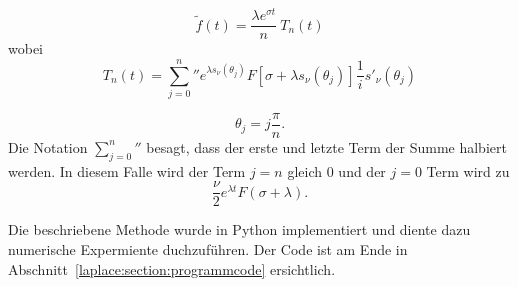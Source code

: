 \begin{equation}
\tilde{f}(t) = \frac{\lambda e^{\sigma t}}{n}~T_{n}(t)
\end{equation}
wobei 
\begin{equation}
T_{n}(t)
=
{\sum_{j=0}^n}'' e^{\lambda s_{\nu}(\theta_{j})}
F[\sigma + \lambda s_{\nu}(\theta_{j})]
\frac{1}{i} s'_{\nu}(\theta_{j})
\end{equation}

\begin{equation}
\theta_{j} = j \frac{\pi}{n}.
\end{equation}
Die Notation ${\sum_{j=0}^n}''$ besagt, dass der erste und letzte
Term der Summe halbiert werden.
In diesem Falle wird der Term $j=n$ gleich 0 und der $j=0$ Term wird zu
\begin{equation}
\frac{\nu}{2}e^{\lambda t}F(\sigma + \lambda).
\end{equation}


Die beschriebene Methode wurde in Python implementiert und diente dazu numerische Expermiente duchzuführen.
Der Code ist am Ende in Abschnitt~\ref{laplace:section:programmcode} ersichtlich. 

